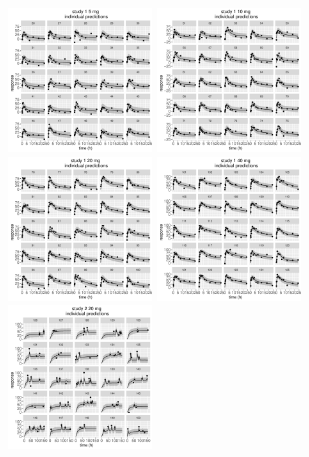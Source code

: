 \documentclass[10pt, reqno, oneside]{amsbook}
\numberwithin{equation}{chapter}
\numberwithin{figure}{chapter}
\numberwithin{table}{chapter}
\theoremstyle{remark}
\begin{document}
\begin{figure}[!htb]
\includegraphics[width=1.5in,trim=0in 0in 0 0in]{graphics/effCptModelTorsten_0.82/effCptPlots023.pdf}
\includegraphics[width=1.5in,trim=0in 0in 0 0in]{graphics/effCptModelTorsten_0.82/effCptPlots024.pdf}
\includegraphics[width=1.5in,trim=0in 0in 0 0in]{graphics/effCptModelTorsten_0.82/effCptPlots025.pdf}
\includegraphics[width=1.5in,trim=0in 0in 0 0in]{graphics/effCptModelTorsten_0.82/effCptPlots026.pdf}
\includegraphics[width=1.5in,trim=0in 0in 0 0in]{graphics/effCptModelTorsten_0.82/effCptPlots027.pdf}

\end{figure}
\end{document}
